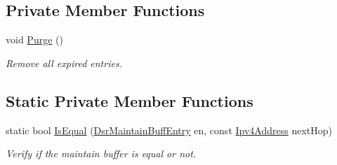 \subsection*{Private Member Functions}
\begin{DoxyCompactItemize}
\item 
void \hyperlink{classns3_1_1dsr_1_1DsrMaintainBuffer_af12ee29b56abcaac29b60c0a544494b9}{Purge} ()
\begin{DoxyCompactList}\small\item\em Remove all expired entries. \end{DoxyCompactList}\end{DoxyCompactItemize}
\subsection*{Static Private Member Functions}
\begin{DoxyCompactItemize}
\item 
static bool \hyperlink{classns3_1_1dsr_1_1DsrMaintainBuffer_a2b6701a0cc73fa909fb1e7ff154b8b2d}{Is\+Equal} (\hyperlink{classns3_1_1dsr_1_1DsrMaintainBuffEntry}{Dsr\+Maintain\+Buff\+Entry} en, const \hyperlink{classns3_1_1Ipv4Address}{Ipv4\+Address} next\+Hop)
\begin{DoxyCompactList}\small\item\em Verify if the maintain buffer is equal or not. \end{DoxyCompactList}\end{DoxyCompactItemize}
